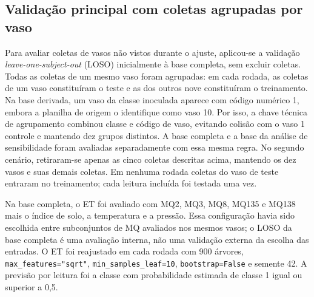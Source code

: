 \subsection{Validação principal com coletas agrupadas por vaso}
\label{subsec:loso_complementar}

Para avaliar coletas de vasos não vistos durante o ajuste, aplicou-se a
validação \textit{leave-one-subject-out} (LOSO) inicialmente à base completa,
sem excluir coletas. Todas as coletas de um mesmo vaso foram agrupadas:
em cada rodada, as coletas de um vaso constituíram o teste e as dos outros
nove constituíram o treinamento. Na base derivada, um vaso da classe
inoculada aparece com código numérico 1, embora a planilha de origem o
identifique como vaso 10. Por isso, a chave técnica de agrupamento combinou
classe e código de vaso, evitando colisão com o vaso 1 controle e mantendo
dez grupos distintos.
A base completa e a base da análise de sensibilidade
foram avaliadas separadamente com essa mesma regra. No segundo cenário,
retiraram-se apenas as cinco coletas descritas acima, mantendo os dez
vasos e suas demais coletas. Em nenhuma rodada coletas do vaso de teste
entraram no treinamento; cada leitura incluída foi testada uma vez.

Na base completa, o ET foi avaliado com MQ2, MQ3, MQ8, MQ135 e MQ138 mais
o índice de solo, a temperatura e a pressão. Essa configuração havia sido
escolhida entre subconjuntos de MQ avaliados nos mesmos vasos; o LOSO da
base completa é uma avaliação interna, não uma validação externa da
escolha das entradas.
O ET foi reajustado em
cada rodada com 900 árvores,
\texttt{max\_features="sqrt"}, \texttt{min\_samples\_leaf=10},
\texttt{bootstrap=False} e semente 42. A previsão por leitura foi a classe
com probabilidade estimada de classe 1 igual ou superior a 0,5.

